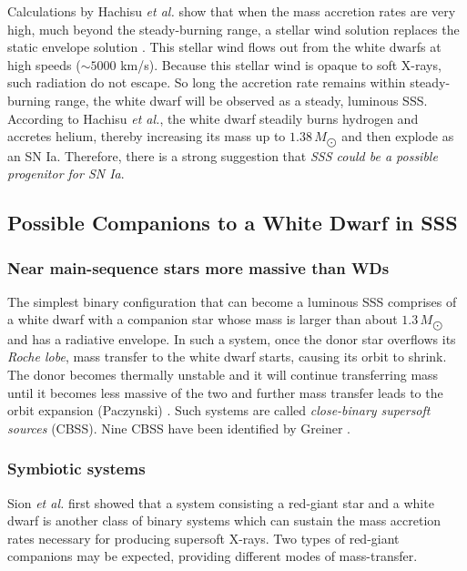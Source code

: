 			Calculations by Hachisu \emph{et al.} show that when the mass accretion rates are very high, much beyond the steady-burning range, a stellar wind solution replaces the static envelope solution \cite{hachisu96}. This stellar wind flows out from the white dwarfs at high speeds ($\sim 5000$ km/s). Because this stellar wind is opaque to soft X-rays, such radiation do not escape. So long the accretion rate remains within steady-burning range, the white dwarf will be observed as a steady, luminous SSS. According to Hachisu \emph{et al.}, the white dwarf steadily burns hydrogen and accretes helium, thereby increasing its mass up to $1.38\,M_{\bigodot}$ and then explode as an SN Ia. Therefore, there is a strong suggestion that \emph{SSS could be a possible progenitor for SN Ia}.
		
		\subsection{Possible Companions to a White Dwarf in SSS} \label{introduction:current_status:wd-companions}
			\subsubsection{Near main-sequence stars more massive than WDs}
				The simplest binary configuration that can become a luminous SSS comprises of a white dwarf with a companion star whose mass is larger than about $1.3\,M_{\bigodot}$ and has a radiative envelope. In such a system, once the donor star overflows its \emph{Roche lobe}, mass transfer to the white dwarf starts, causing its orbit to shrink. The donor becomes thermally unstable and it will continue transferring mass until it becomes less massive of the two and further mass transfer leads to the orbit expansion (Paczynski) \cite{paczynski71}. Such systems are called \emph{close-binary supersoft sources} (CBSS). Nine CBSS have been identified by Greiner \cite{greiner2000catalog,greiner2000catalogOnline}.
				
			\subsubsection{Symbiotic systems}
				Sion \emph{et al.}\cite{sion94} first showed that a system consisting a red-giant star and a white dwarf is another class of binary systems which can sustain the mass accretion rates necessary for producing supersoft X-rays. Two types of red-giant companions may be expected, providing different modes of mass-transfer.
				

